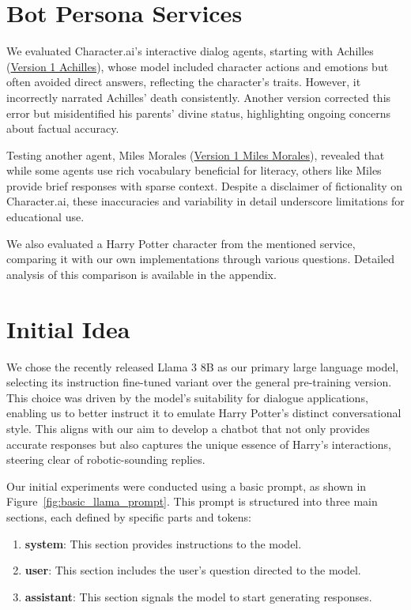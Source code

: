 \documentclass[fleqn,moreauthors,10pt]{ds_report}
\begin{document}
\section*{Bot Persona Services}

We evaluated Character.ai's interactive dialog agents, starting with Achilles (\href{https://character.ai/chat/EBMwCtvGQWrCk_xeglpGWfQiCJOCkGu7PMWbEWLINlY}{Version 1 Achilles}), whose model included character actions and emotions but often avoided direct answers, reflecting the character's traits. However, it incorrectly narrated Achilles' death consistently. Another version corrected this error but misidentified his parents' divine status, highlighting ongoing concerns about factual accuracy.

Testing another agent, Miles Morales (\href{ttps://character.ai/chat/KfUosnPgcC9hoTWbJq_2z1cQi-719T8cldRLa2fTb1Y}{Version 1 Miles Morales}), revealed that while some agents use rich vocabulary beneficial for literacy, others like Miles provide brief responses with sparse context. Despite a disclaimer of fictionality on Character.ai, these inaccuracies and variability in detail underscore limitations for educational use.

We also evaluated a Harry Potter character from the mentioned service, comparing it with our own implementations through various questions. Detailed analysis of this comparison is available in the appendix.

\section*{Initial Idea}
    
    We chose the recently released Llama 3 8B as our primary large language model, selecting its instruction fine-tuned variant over the general pre-training version. This choice was driven by the model’s suitability for dialogue applications, enabling us to better instruct it to emulate Harry Potter’s distinct conversational style. This aligns with our aim to develop a chatbot that not only provides accurate responses but also captures the unique essence of Harry's interactions, steering clear of robotic-sounding replies.
    
    Our initial experiments were conducted using a basic prompt, as shown in Figure~\ref{fig:basic_llama_prompt}. This prompt is structured into three main sections, each defined by specific parts and tokens:
    
    \begin{enumerate}
        \item \textbf{system}: This section provides instructions to the model.
        \item \textbf{user}: This section includes the user's question directed to the model.
        \item \textbf{assistant}: This section signals the model to start generating responses.
    \end{enumerate}
\end{document}
